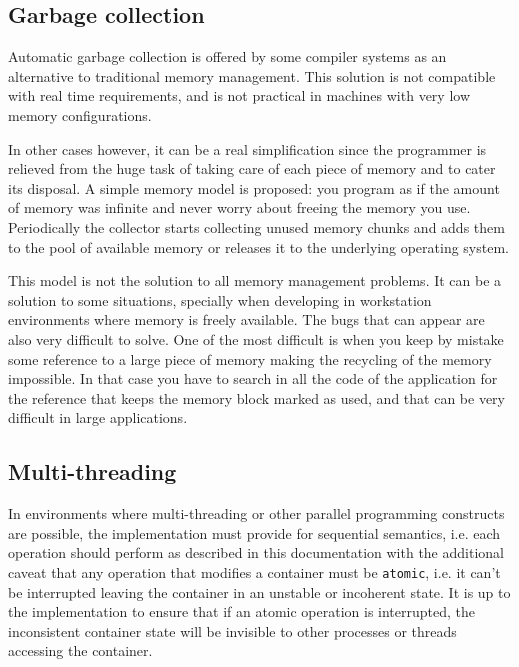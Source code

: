 \documentclass[12pt,a4paper]{memoir} %
\begin{document}
\subsection{Garbage collection}
Automatic garbage collection is offered by some compiler systems as an alternative to traditional memory management. This solution is
not compatible with real time requirements, and is not practical in machines with very low memory configurations.

In other cases however, it can be a real simplification since the programmer is relieved from the huge task of taking care of each
piece of memory and to cater its disposal. A simple memory model is proposed: you program as if the amount of memory was infinite
and never worry about freeing the memory you use. Periodically the collector starts collecting unused memory chunks and adds them
to the pool of available memory or releases it to the underlying operating system.

This model is not the solution to all memory management problems. It can be a solution to some situations, specially when developing
in workstation environments where memory is freely available. The bugs that can appear are also very difficult to solve. One of the
most difficult is when you keep by mistake some reference to a large piece of memory making the recycling of the memory impossible.
In that case you have to search in all the code of the application for the reference that keeps the memory block marked as used, and that can
be very difficult in large applications.
\subsection{Multi-threading}
In environments where multi-threading or other parallel programming constructs are possible, the implementation must provide for sequential
semantics, i.e. each operation should perform as described in this documentation with the additional caveat that any operation that modifies
a container must be \texttt{atomic}, i.e. it can't be interrupted leaving the container in an unstable or incoherent state. It is up to the
implementation to ensure that if an atomic operation is interrupted, the inconsistent container state will be invisible to other processes
or threads accessing the container.
\end{document}

